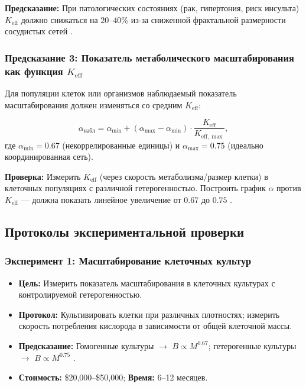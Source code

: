 \documentclass[12pt]{article}
\newcommand{\Keff}{K_{\mathrm{eff}}}
\begin{document}
	\textbf{Предсказание:} При патологических состояниях (рак, гипертония, риск инсульта) \(\Keff\) должно снижаться на \(20\)–\(40\%\) из-за сниженной фрактальной размерности сосудистых сетей \cite{Gould1993}.
	
	\subsubsection{Предсказание 3: Показатель метаболического масштабирования как функция $\Keff$}
	
	Для популяции клеток или организмов наблюдаемый показатель масштабирования должен изменяться со средним $\Keff$:
	
	\begin{equation}
		\alpha_{\text{набл}} = \alpha_{\min} + (\alpha_{\max} - \alpha_{\min}) \cdot \frac{\Keff}{K_{\mathrm{eff},\max}},
		\label{eq:scaling-exponent}
	\end{equation}
	где $\alpha_{\min} = 0.67$ (некоррелированные единицы) и $\alpha_{\max} = 0.75$ (идеально координированная сеть).
	
	\textbf{Проверка:} Измерить $\Keff$ (через скорость метаболизма/размер клетки) в клеточных популяциях с различной гетерогенностью. Построить график $\alpha$ против $\Keff$ — должна показать линейное увеличение от $0.67$ до $0.75$ \cite{Takemoto2015}.
	
	\subsection{Протоколы экспериментальной проверки}
	
	\subsubsection{Эксперимент 1: Масштабирование клеточных культур}
	\begin{itemize}
		\item \textbf{Цель:} Измерить показатель масштабирования в клеточных культурах с контролируемой гетерогенностью.
		\item \textbf{Протокол:} Культивировать клетки при различных плотностях; измерить скорость потребления кислорода в зависимости от общей клеточной массы.
		\item \textbf{Предсказание:} Гомогенные культуры \(\rightarrow\) \(B \propto M^{0.67}\); гетерогенные культуры \(\rightarrow\) \(B \propto M^{0.75}\) \cite{Takemoto2015}.
		\item \textbf{Стоимость:} \$20,000–\$50,000; \textbf{Время:} 6–12 месяцев.
	\end{itemize}
	
\end{document}

